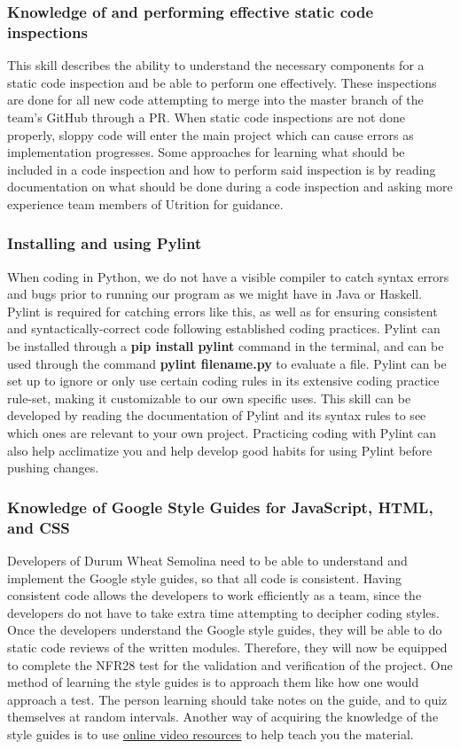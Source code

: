 \documentclass[12pt, titlepage]{article}
\begin{document}
	\subsubsection*{Knowledge of and performing effective static code inspections}
	This skill describes the ability to understand the necessary components for a static code inspection and be able to perform one effectively. These inspections are done for all new code attempting to merge into the master branch of the team's GitHub through a PR. When static code inspections are not done properly, sloppy code will enter the main project which can cause errors as implementation progresses. Some approaches for learning what should be included in a code inspection and how to perform said inspection is by reading documentation on what should be done during a code inspection and asking more experience team members of Utrition for guidance.
	
	\subsubsection*{Installing and using Pylint}
	When coding in Python, we do not have a visible compiler to catch syntax errors and bugs prior to running our program as we might have in Java or Haskell. Pylint is required for catching errors like this, as well as for ensuring consistent and syntactically-correct code following established coding practices. Pylint can be installed through a \textbf{pip install pylint} command in the terminal, and can be used through the command \textbf{pylint filename.py} to evaluate a file. Pylint can be set up to ignore or only use certain coding rules in its extensive coding practice rule-set, making it customizable to our own specific uses. This skill can be developed by reading the documentation of Pylint and its syntax rules to see which ones are relevant to your own project. Practicing coding with Pylint can also help acclimatize you and help develop good habits for using Pylint before pushing changes.
	
	\subsubsection*{Knowledge of Google Style Guides for JavaScript, HTML, and CSS}
	Developers of Durum Wheat Semolina need to be able to understand and implement the Google style guides, so that all code is consistent. Having consistent code allows the developers to work efficiently as a team, since the developers do not have to take extra time attempting to decipher coding styles. Once the developers understand the Google style guides, they will be able to do static code reviews of the written modules. Therefore, they will now be equipped to complete the NFR28 test for the validation and verification of the project. One method of learning the style guides is to approach them like how one would approach a test. The person learning should take notes on the guide, and to quiz themselves at random intervals. Another way of acquiring the knowledge of the style guides is to use \href{https://www.youtube.com/watch?v=RFFsT5YQuSQ}{online video resources} to help teach you the material.
	
\end{document}
